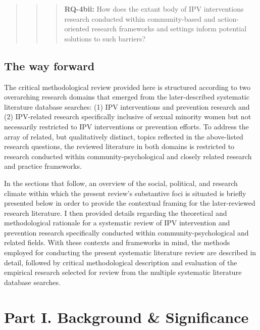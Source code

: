 \documentclass[11pt,]{tufte-book}
\newcommand{\rowgroup}[2][-1em]{\hspace{#1}#2}
\begin{document}
\begin{quote}
\begin{quote}
\begin{quote}
\rowgroup[-3em]{\textbf{RQ-4bii:} How does the extant body of IPV interventions research conducted within community-based and action-oriented research frameworks and settings inform potential solutions to such barriers?}
\end{quote}
\end{quote}
\end{quote}

\chapter{The way forward}\label{the-way-forward}

The critical methodological review provided here is structured according
to two overarching research domains that emerged from the
later-described systematic literature database searches: (1) IPV
interventions and prevention research and (2) IPV-related research
specifically inclusive of sexual minority women but not necessarily
restricted to IPV interventions or prevention efforts. To address the
array of related, but qualitatively distinct, topics reflected in the
above-listed research questions, the reviewed literature in both domains
is restricted to research conducted within community-psychological and
closely related research and practice frameworks.

In the sections that follow, an overview of the social, political, and
research climate within which the present review's substantive foci is
situated is briefly presented below in order to provide the contextual
framing for the later-reviewed research literature. I then provided
details regarding the theoretical and methodological rationale for a
systematic review of IPV intervention and prevention research
specifically conducted within community-psychological and related
fields. With these contexts and frameworks in mind, the methods employed
for conducting the present systematic literature review are described in
detail, followed by critical methodological description and evaluation
of the empirical research selected for review from the multiple
systematic literature database searches.

\part{Part I. Background \& Significance}
\end{document}
